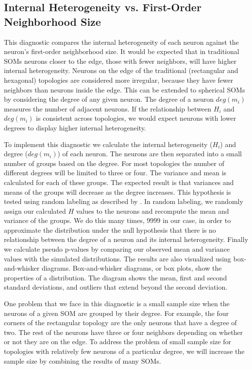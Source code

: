 \subsection{Internal Heterogeneity vs. First-Order Neighborhood Size}
\label{q1}
This diagnostic compares the internal heterogeneity of each neuron against
the neuron's first-order neighborhood size.  It would be expected that in
traditional SOMs neurons closer to the edge, those with fewer neighbors, will
have higher internal heterogeneity. Neurons on the edge of the traditional
(rectangular and hexagonal) topologies are considered more irregular, because
they have fewer neighbors than neurons inside the edge.  This can be extended to
spherical SOMs by considering the degree of any given neuron.  The degree of a
neuron $deg(m_i)$ measures the number of adjacent neurons.  If the
relationship between $H_i$ and $deg(m_i)$ is consistent across topologies,
we would expect neurons with lower degrees to display higher internal heterogeneity.

To implement this diagnostic we calculate the internal heterogeneity ($H_i$)
and degree ($deg(m_i)$) of each neuron. The neurons are then separated into a small number of
groups based on the degree.  For most topologies the number of
different degrees will be limited to three or four.  The variance and mean
is calculated for each of these groups.  The expected result is that
variances and means of the groups will decrease as the degree increases.  This
hypothesis is tested using random labeling as described by \cite{siss2004}.
In random labeling, we randomly assign our calculated $H$ values to the
neurons and recompute the mean and variance of the groups.  We do this many times,
9999 in our case, in order to approximate the distribution under the null
hypothesis that there is no relationship between the degree of a neuron and
its internal heterogeneity. Finally we
calculate pseudo p-values by comparing our observed mean and variance values
with the simulated distributions.  The results are also visualized using
box-and-whisker diagrams. Box-and-whisker diagrams, or box plots, show the
properties of a distribution.  The diagram shows the mean, first and second
standard deviations, and outliers that extend beyond the second deviation.

One problem that we face in this diagnostic is a small sample size when the neurons of a given
SOM are grouped by their degree.  For example, the four corners of the
rectangular topology are the only neurons that have a degree of two.  The rest
of the neurons have three or four neighbors depending on whether or not they
are on the edge. To address the problem of small sample size for topologies
with relatively few neurons of a particular degree, we will increase
the sample size by combining the results of many SOMs.

